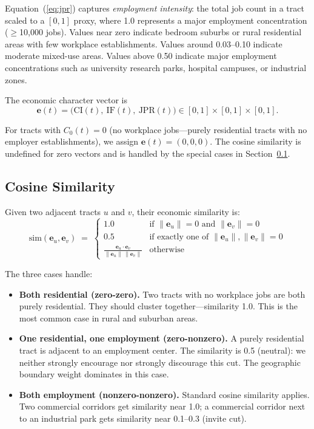 Equation~(\ref{eq:jpr}) captures \emph{employment intensity}: the total
job count in a tract scaled to a $[0,1]$ proxy, where 1.0 represents a major
employment concentration ($\geq$10,000 jobs).
Values near zero indicate bedroom suburbs or rural residential areas with few
workplace establishments.
Values around 0.03--0.10 indicate moderate mixed-use areas.
Values above 0.50 indicate major employment concentrations such as university
research parks, hospital campuses, or industrial zones.

The economic character vector is
\begin{equation}
  \mathbf{e}(t) = \bigl(\mathrm{CI}(t),\ \mathrm{IF}(t),\ \mathrm{JPR}(t)\bigr)
  \in [0,1] \times [0,1] \times [0,1].
  \label{eq:econ-char}
\end{equation}

For tracts with $C_0(t) = 0$ (no workplace jobs---purely residential tracts
with no employer establishments), we assign
$\mathbf{e}(t) = (0, 0, 0)$.
The cosine similarity is undefined for zero vectors and is handled
by the special cases in Section~\ref{subsec:cosine}.

\subsection{Cosine Similarity}
\label{subsec:cosine}

Given two adjacent tracts $u$ and $v$, their economic similarity is:
\begin{equation}
  \mathrm{sim}(\mathbf{e}_u, \mathbf{e}_v)
  \;=\;
  \begin{cases}
    1.0 & \text{if } \|\mathbf{e}_u\| = 0 \text{ and } \|\mathbf{e}_v\| = 0 \\
    0.5 & \text{if exactly one of } \|\mathbf{e}_u\|, \|\mathbf{e}_v\| = 0 \\
    \displaystyle\frac{\mathbf{e}_u \cdot \mathbf{e}_v}{\|\mathbf{e}_u\|\,\|\mathbf{e}_v\|}
        & \text{otherwise}
  \end{cases}
  \label{eq:cosine}
\end{equation}

The three cases handle:
\begin{itemize}
  \item \textbf{Both residential (zero-zero).}
    Two tracts with no workplace jobs are both purely residential.
    They should cluster together---similarity 1.0.
    This is the most common case in rural and suburban areas.
  \item \textbf{One residential, one employment (zero-nonzero).}
    A purely residential tract is adjacent to an employment center.
    The similarity is 0.5 (neutral): we neither strongly encourage nor
    strongly discourage this cut.
    The geographic boundary weight dominates in this case.
  \item \textbf{Both employment (nonzero-nonzero).}
    Standard cosine similarity applies.
    Two commercial corridors get similarity near 1.0;
    a commercial corridor next to an industrial park gets similarity
    near 0.1--0.3 (invite cut).
\end{itemize}

